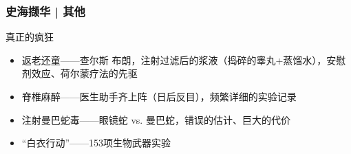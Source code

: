 \begin{frame}
  \frametitle{史海撷华 | 其他}
  \begin{block}{真正的疯狂}
    \begin{itemize}
    \item 返老还童——查尔斯 \textbullet 布朗，注射过滤后的浆液（捣碎的睾丸+蒸馏水），安慰剂效应、\alert{荷尔蒙疗法}的先驱
      \item 脊椎麻醉——医生助手齐上阵（日后反目），频繁详细的实验记录
      \item 注射曼巴蛇毒——眼镜蛇 vs. 曼巴蛇，错误的估计、巨大的代价
      \item “白衣行动”——153项生物武器实验
    \end{itemize}
  \end{block}
\end{frame}



